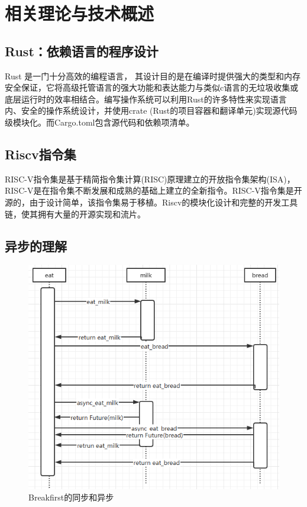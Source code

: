 \chapter{相关理论与技术概述}
\label{chap:knowledge}

\section{Rust：依赖语言的程序设计}

Rust 是一门十分高效的编程语言， 其设计目的是在编译时提供强大的类型和内存安全保证，它将高级托管语言的强大功能和表达能力与类似c语言的无垃圾收集或底层运行时的效率相结合。编写操作系统可以利用Rust的许多特性来实现语言内、安全的操作系统设计，并使用crate (Rust的项目容器和翻译单元)实现源代码级模块化。而Cargo.toml包含源代码和依赖项清单。

\section{Riscv指令集}

RISC-V指令集是基于精简指令集计算(RISC)原理建立的开放指令集架构(ISA)，RISC-V是在指令集不断发展和成熟的基础上建立的全新指令。RISC-V指令集是开源的，由于设计简单，该指令集易于移植。Riscv的模块化设计和完整的开发工具链，使其拥有大量的开源实现和流片。

\section{异步的理解}
\begin{figure}[htb]
    \figureCapSet
    \centering
    \includegraphics[scale=0.5]{figure/c2/breakfirstsequence.png}
    \caption{Breakfirst的同步和异步}
    \label{figure:c2breakfirstsequence}
\end{figure}

